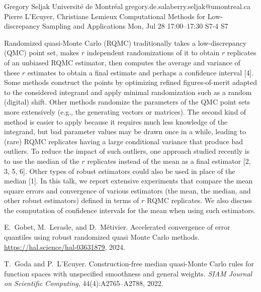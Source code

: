 \documentclass[12pt,lettersize,oneside]{book} %
\begin{document}
\begin{talk}
  {Gregory Seljak}%
  {Universit\'e de Montr\'eal}%
  {gregory.de.salaberry.seljak@umontreal.ca}%
  {Pierre L'Ecuyer, Christiane Lemieux}%
  {Computational Methods for Low-discrepancy Sampling and Applications}%
  {}%
  {Mon, Jul 28 17:00--17:30}%
  {S7-4}%
  {S7}%

\medskip

Randomized quasi-Monte Carlo (RQMC) traditionally takes a low-discrepancy (QMC) point set,
makes $r$ independent randomizations of it to obtain $r$ replicates of an unbiased RQMC estimator, 
then computes the average and variance of these $r$ estimates to obtain a final estimate 
and perhaps a confidence interval [4]. 
Some methods construct the points by optimizing refined figures-of-merit adapted to the considered integrand
and apply minimal randomization such as a random (digital) shift.  Other methods randomize
the parameters of the QMC point sets more extensively (e.g., the generating vectors or matrices).
The second kind of method is easier to apply because it requires much less knowledge of the integrand,
but bad parameter values may be drawn once in a while, leading to (rare) RQMC replicates having 
a large conditional variance that produce bad outliers.
To reduce the impact of such outliers, one approach studied recently is to use the median 
of the $r$ replicates instead of the mean as a final estimator [2, 3, 5, 6].
Other types of robust estimators could also be used in place of the median [1].
In this talk, we report extensive experiments that compare the mean square errors 
and convergence of various estimators (the mean, the median, and other robust estimators) 
defined in terms of $r$ RQMC replicates.
We also discuss the computation of confidence intervals for the mean when using such estimators.

{
%
\item
E.~Gobet, M.~Lerasle, and D.~M{\'e}tivier.
Accelerated convergence of error quantiles using robust randomized
  quasi {Monte Carlo} methods.
\url{https://hal.science/hal-03631879}, 2024.

\item
T.~Goda and P.~L'Ecuyer.
Construction-free median quasi-{Monte Carlo} rules for function
  spaces with unspecified smoothness and general weights.
{\em {SIAM} Journal on Scientific Computing}, 44(4):A2765--A2788, 2022.

}
\end{talk}
\end{document}
